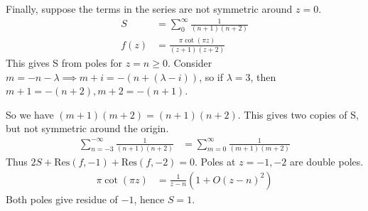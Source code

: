\documentclass[a4paper, 11pt, normalem]{report}
\begin{document}
Finally, suppose the terms in the series are not symmetric around $z = 0$.
\begin{align}
    S &= \sum_0^\infty \frac{1}{(n+1)(n+2)} \\
    f(z) &= \frac{\pi\cot(\pi z)}{(z+1)(z+2)}
\end{align}
This gives S from poles for $z = n \geq 0$. 
Consider $m = -n-\lambda \implies m+i = -(n+(\lambda-i))$, so if $\lambda = 3$, then $m+1 = -(n+2), m+2 = -(n+1)$. 

So we have $(m+1)(m+2) = (n+1)(n+2)$. 
This gives two copies of S, but not symmetric around the origin.
\begin{align}
    \sum_{n=-3}^{-\infty} \frac{1}{(n+1)(n+2)} &= \sum_{m=0}^\infty \frac{1}{(m+1)(m+2)}
\end{align}
Thus $2S + \text{Res}(f, -1) + \text{Res}(f,-2) = 0$. 
Poles at $z = -1,-2$ are double poles. 
\begin{align}
\pi\cot(\pi z) &= \frac{1}{z-n}(1 + O(z-n)^2)
\end{align}
Both poles give residue of $-1$, hence $S = 1$.


\end{document}
